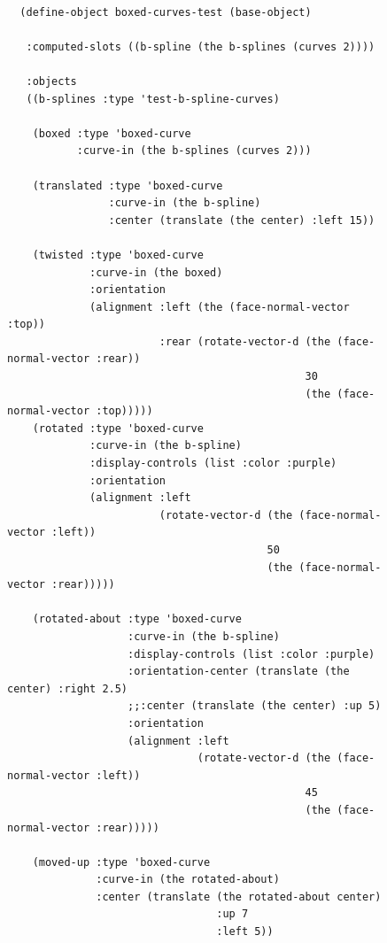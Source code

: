 \documentclass [11pt]{book}
\begin{document}
\begin{itemize}
\begin{description}
\end{description}




\begin{figure}
\begin{lrbox}{\boxedverb}
\begin{minipage}{\linewidth}
{\small

\begin{verbatim}

  (define-object boxed-curves-test (base-object)
  
   :computed-slots ((b-spline (the b-splines (curves 2))))
  
   :objects
   ((b-splines :type 'test-b-spline-curves)
    
    (boxed :type 'boxed-curve
           :curve-in (the b-splines (curves 2)))
    
    (translated :type 'boxed-curve
                :curve-in (the b-spline)
                :center (translate (the center) :left 15))
    
    (twisted :type 'boxed-curve
             :curve-in (the boxed)
             :orientation 
             (alignment :left (the (face-normal-vector :top))
                        :rear (rotate-vector-d (the (face-normal-vector :rear))
                                               30
                                               (the (face-normal-vector :top)))))
    (rotated :type 'boxed-curve
             :curve-in (the b-spline)
             :display-controls (list :color :purple)
             :orientation 
             (alignment :left 
                        (rotate-vector-d (the (face-normal-vector :left))
                                         50
                                         (the (face-normal-vector :rear)))))
   
    (rotated-about :type 'boxed-curve
                   :curve-in (the b-spline)
                   :display-controls (list :color :purple)
                   :orientation-center (translate (the center) :right 2.5)
                   ;;:center (translate (the center) :up 5)
                   :orientation 
                   (alignment :left 
                              (rotate-vector-d (the (face-normal-vector :left))
                                               45
                                               (the (face-normal-vector :rear)))))
  
    (moved-up :type 'boxed-curve
              :curve-in (the rotated-about)
              :center (translate (the rotated-about center) 
                                 :up 7
                                 :left 5))


\end{verbatim}}
\end{minipage}
\end{lrbox}
\end{figure}
\end{itemize}
\end{document}
